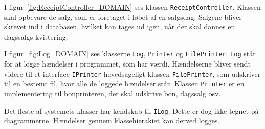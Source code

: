 
I figur~\ref{fig:ReceiptController_DOMAIN} ses klassen \texttt{ReceiptController}. Klassen skal opbevare de salg, som er foretaget i løbet af en salgsdag. Salgene bliver skrevet ind i databasen, hvilket kan tages ud igen, når der skal dannes en dagssalgs kvittering.


I figur~\ref{fig:Log_DOMAIN} ses klasserne \texttt{Log}, \texttt{Printer} og \texttt{FilePrinter}. \texttt{Log} står for at logge hændelser i programmet, som har værdi. Hændelserne bliver sendt videre til et interface \texttt{IPrinter} hovedsageligt klassen \texttt{FilePrinter}, som udskriver til en bestemt fil, hvor alle de loggede hændelser står. Klassen \texttt{Printer} er en implementering til bonprinteren, der skal udskrive bon, dagssalg osv.


Det fleste af systemets klasser har kendskab til \texttt{ILog}. Dette er dog ikke tegnet på diagrammerne. Hændelser gennem klassehierakiet kan derved logges.